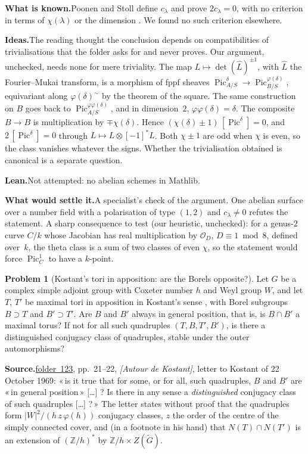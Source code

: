 \documentclass[11pt]{article}
\newcommand{\q}[1]{«\,#1\,»}
\newcommand{\fac}[1]{\href{https://grothendieck.umontpellier.fr/#1.pdf}{folder~#1}}
\newcommand{\Pic}{\operatorname{Pic}}
\theoremstyle{definition}
\newtheorem{problem}{Problem}
\theoremstyle{plain}\newtheorem*{proposition}{Proposition}\theoremstyle{definition}
\newcommand{\entry}[1]{\par\medskip\noindent\textbf{#1}\enspace}
\newcommand{\src}[1]{\entry{Source.}#1}
\newcommand{\known}{\entry{What is known.}}
\newcommand{\ideas}{\entry{Ideas.}}
\newcommand{\leanst}{\entry{Lean.}}
\newcommand{\settle}{\entry{What would settle it.}}
\begin{document}
\known Poonen and Stoll define $c_\lambda$ and prove $2c_\lambda = 0$, with no criterion in terms of $\chi(\lambda)$ or the dimension \cite[\S4]{poonenstoll}. We found no such criterion elsewhere.

\ideas The reading thought the conclusion depends on compatibilities of trivialisations that the folder asks for and never proves. Our argument, unchecked, needs none for mere triviality. The map $L \mapsto \det(\hat L)^{\pm1}$, with $\hat L$ the Fourier--Mukai transform, is a morphism of fppf sheaves $\Pic^\delta_{A/S} \to \Pic^{\varphi(\delta)}_{B/S}$, equivariant along $\varphi(\delta)^\sim$ by the theorem of the square. The same construction on $B$ goes back to $\Pic^{\varphi\varphi(\delta)}_{A/S}$, and in dimension~$2$, $\varphi\varphi(\delta) = \delta$. The composite $B \to B$ is multiplication by $\mp\chi(\delta)$. Hence $(\chi(\delta) \pm 1)\,[\Pic^\delta] = 0$, and $2\,[\Pic^\delta] = 0$ through $L \mapsto L \otimes [-1]^*L$. Both $\chi \pm 1$ are odd when $\chi$ is even, so the class vanishes whatever the signs. Whether the trivialisation obtained is canonical is a separate question.

\leanst Not attempted: no abelian schemes in Mathlib.

\settle A specialist's check of the argument. One abelian surface over a number field with a polarisation of type $(1,2)$ and $c_\lambda \ne 0$ refutes the statement. A sharp consequence to test (our heuristic, unchecked): for a genus-$2$ curve $C/k$ whose Jacobian has real multiplication by $\mathcal O_D$, $D \equiv 1 \bmod 8$, defined over~$k$, the theta class is a sum of two classes of even $\chi$, so the statement would force $\Pic^1_C$ to have a $k$-point.

\begin{problem}[Kostant's tori in apposition: are the Borels opposite?]\label{p:kostant}
Let $G$ be a complex simple adjoint group with Coxeter number $h$ and Weyl group $W$, and let $T$, $T'$ be maximal tori in apposition in Kostant's sense \cite{kostant}, with Borel subgroups $B \supset T$ and $B' \supset T'$. Are $B$ and $B'$ always in general position, that is, is $B \cap B'$ a maximal torus? If not for all such quadruples $(T, B, T', B')$, is there a distinguished conjugacy class of quadruples, stable under the outer automorphisms?
\end{problem}

\src{\fac{123}, pp.~21--22, \emph{[Autour de Kostant]}, letter to Kostant of 22 October 1969: \q{is it true that for some, or for all, such quadruples, $B$ and $B'$ are \q{in general position} [\dots] ? Is there in any sense a \emph{distinguished} conjugacy class of such quadruples [\dots] ?} The letter states without proof that the quadruples form $|W|^2/(h\,z\,\varphi(h))$ conjugacy classes, $z$ the order of the centre of the simply connected cover, and (in a footnote in his hand) that $N(T) \cap N(T')$ is an extension of $(\mathbb Z/h)^*$ by $\mathbb Z/h \times Z(\tilde G)$.}
\end{document}
